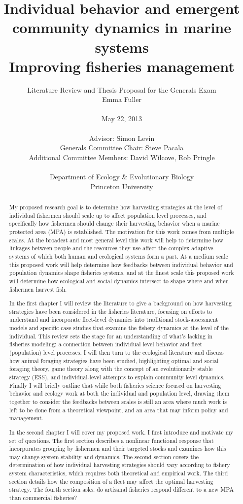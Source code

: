\documentclass[12pt,a4paper]{report}
\title{{\bf Individual behavior and emergent community dynamics in marine systems}\\
{\Large Improving fisheries management}}
\date{}
\author{Literature Review and Thesis Proposal for the Generals Exam \\
Emma Fuller \\
\vspace{4cm}\\
May 22, 2013 \\
\vspace{5cm}\\
Advisor: Simon Levin\\
Generals Committee Chair: Steve Pacala \\
Additional Committee Members: David Wilcove, Rob Pringle \\
\vspace{1.5cm} \\
Department of Ecology \& Evolutionary Biology \\
Princeton University}
\begin{document}
\maketitle
\onehalfspacing
\renewcommand{\abstractname}{Overview}
\begin{abstract}
My proposed research goal is to determine how harvesting strategies at the level of individual fishermen should scale up to affect population level processes, and specifically how fishermen should change their harvesting behavior when a marine protected area (MPA) is established. The motivation for this work comes from multiple scales. At the broadest and most general level this work will help to determine how linkages between people and the resources they use affect the complex adaptive systems of which both human and ecological systems form a part. At a medium scale this proposed work will help determine how feedbacks between individual behavior and population dynamics shape fisheries systems, and at the finest scale this proposed work will determine how ecological and social dynamics intersect to shape where and when fishermen harvest fish. 

In the first chapter I will review the literature to give a background on how harvesting strategies have been considered in the fisheries literature, focusing on efforts to understand and incorporate fleet-level dynamics into traditional stock-assessment models and specific case studies that examine the fishery dynamics at the level of the individual. This review sets the stage for an understanding of what's lacking in fisheries modeling: a connection between individual level behavior and fleet (population) level processes. I will then turn to the ecological literature and discuss how animal foraging strategies have been studied, highlighting optimal and social foraging theory, game theory along with the concept of an evolutionarily stable strategy (ESS), and individual-level attempts to explain community level dynamics. Finally I will briefly outline that while both fisheries science focused on harvesting behavior and ecology work at both the individual and population level, drawing them together to consider the feedbacks between scales is still an area where much work is left to be done from a theoretical viewpoint, and an area that may inform policy and management. 

In the second chapter I will cover my proposed work. I first introduce and motivate my set of questions. The first section describes a nonlinear functional response that incorporates grouping by fishermen and their targeted stocks and examines how this may change system stability and dynamics. The second section covers the determination of how individual harvesting strategies should vary according to fishery system characteristics, which requires both theoretical and empirical work. The third section details how the composition of a fleet may affect the optimal harvesting strategy. The fourth section asks: do artisanal fisheries respond different to a new MPA than commercial fisheries?
\end{abstract}
\end{document}
